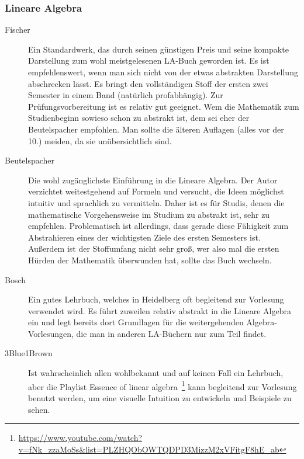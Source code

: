 \subsubsection{Lineare Algebra}
\begin{description}
\item[Fischer]{
		Ein Standardwerk, das durch seinen günstigen Preis und seine kompakte Darstellung zum wohl meistgelesenen \gls{LA}-Buch geworden ist. Es ist empfehlenswert, wenn man sich nicht von der etwas abstrakten Darstellung abschrecken lässt. Es bringt den vollständigen Stoff der ersten zwei Semester in einem Band (natürlich profabhängig). Zur Prüfungsvorbereitung ist es relativ gut geeignet. Wem die Mathematik zum Studienbeginn sowieso schon zu abstrakt ist, dem sei eher der Beutelspacher empfohlen. Man sollte die älteren Auflagen (alles vor der 10.) meiden, da sie unübersichtlich sind.}

\item[Beutelspacher]{
		Die wohl zugänglichste Einführung in die Lineare Algebra. Der Autor verzichtet weitestgehend auf Formeln und versucht, die Ideen möglichst intuitiv und sprachlich zu vermitteln. Daher ist es für Studis, denen die mathematische Vorgehensweise im Studium zu abstrakt ist, sehr zu empfehlen. Problematisch ist allerdings, dass gerade diese Fähigkeit zum Abstrahieren eines der wichtigsten Ziele des ersten Semesters ist. Außerdem ist der Stoffumfang nicht sehr groß, wer also mal die ersten Hürden der Mathematik überwunden hat, sollte das Buch wechseln.}

\item[Bosch]{
		Ein gutes Lehrbuch, welches in Heidelberg oft begleitend zur Vorlesung verwendet wird. Es führt zuweilen relativ abstrakt in die Lineare Algebra ein und legt bereits dort Grundlagen für die weitergehenden Algebra-Vorlesungen, die man in anderen \gls{LA}-Büchern nur zum Teil findet.}
		
\item[3Blue1Brown]{
		Ist wahrscheinlich allen wohlbekannt und auf keinen Fall ein Lehrbuch, aber die Playlist \grqq Essence of linear algebra\grqq\ \footnote{\url{https://www.youtube.com/watch?v=fNk_zzaMoSs&list=PLZHQObOWTQDPD3MizzM2xVFitgF8hE_ab}} kann begleitend zur Vorlesung benutzt werden, um eine visuelle Intuition zu entwickeln und Beispiele zu sehen.
}
\end{description}


